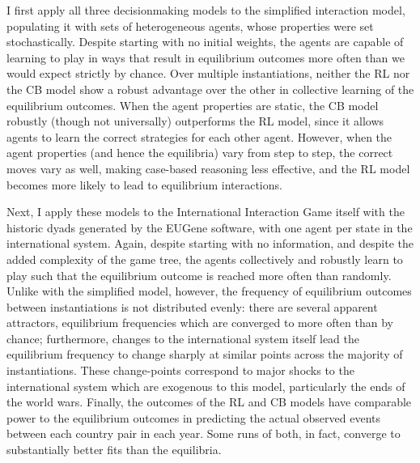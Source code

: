I first apply all three decisionmaking models to the simplified interaction model, populating it with sets of heterogeneous agents, whose properties were set stochastically. Despite starting with no initial weights, the agents are capable of learning to play in ways that result in equilibrium outcomes more often than we would expect strictly by chance. Over multiple instantiations, neither the RL nor the CB model show a robust advantage over the other in collective learning of the equilibrium outcomes. When the agent properties are static, the CB model robustly (though not universally) outperforms the RL model, since it allows agents to learn the correct strategies for each other agent. However, when the agent properties (and hence the equilibria) vary from step to step, the correct moves vary as well, making case-based reasoning less effective, and the RL model becomes more likely to lead to equilibrium interactions.

Next, I apply these models to the International Interaction Game itself with the historic dyads generated by the EUGene software, with one agent per state in the international system. Again, despite starting with no information, and despite the added complexity of the game tree, the agents collectively and robustly learn to play such that the equilibrium outcome is reached more often than randomly. Unlike with the simplified model, however, the frequency of equilibrium outcomes between instantiations is not distributed evenly: there are several apparent attractors, equilibrium frequencies which are converged to more often than by chance; furthermore, changes to the international system itself lead the equilibrium frequency to change sharply at similar points across the majority of instantiations. These change-points correspond to major shocks to the international system which are exogenous to this model, particularly the ends of the world wars. Finally, the outcomes of the RL and CB models have comparable power to the equilibrium outcomes in predicting the actual observed events between each country pair in each year. Some runs of both, in fact, converge to substantially better fits than the equilibria. 

